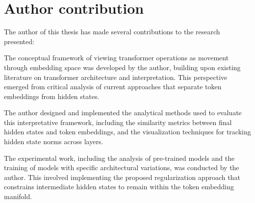 \chapter{Author contribution}

The author of this thesis has made several contributions to the research presented:

The conceptual framework of viewing transformer operations as movement through embedding space was developed by the author, building upon existing literature on transformer architecture and interpretation. This perspective emerged from critical analysis of current approaches that separate token embeddings from hidden states.

The author designed and implemented the analytical methods used to evaluate this interpretative framework, including the similarity metrics between final hidden states and token embeddings, and the visualization techniques for tracking hidden state norms across layers.

The experimental work, including the analysis of pre-trained models and the training of models with specific architectural variations, was conducted by the author. This involved implementing the proposed regularization approach that constrains intermediate hidden states to remain within the token embedding manifold.
